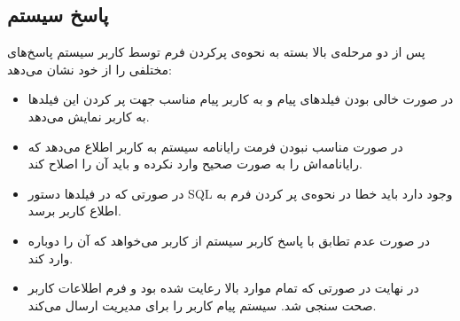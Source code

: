 \documentclass[a4paper]{article}
\begin{document}
\subsection{پاسخ سیستم}
پس از دو مرحله‌ی بالا بسته به نحوه‌ی پرکردن فرم توسط کاربر سیستم پاسخ‌های مختلفی را از خود نشان می‌دهد:
\begin{itemize}
\item
در صورت خالی بودن فیلدهای پیام و  به کاربر پیام مناسب جهت پر کردن این فیلدها به کاربر نمایش می‌دهد.
\item
در صورت مناسب نبودن فرمت رایانامه سیستم به کاربر اطلاع می‌دهد که رایانامه‌اش را به صورت صحیح وارد نکرده و باید آن را اصلاح کند.
\item
در صورتی که در فیلد‌ها دستور SQL وجود دارد باید خطا در نحوه‌ی پر کردن فرم به اطلاع کاربر برسد.
\item
در صورت عدم تطابق  با پاسخ کاربر سیستم از کاربر می‌خواهد که آن را دوباره وارد کند.
\item
در نهایت در صورتی که تمام موارد بالا رعایت شده بود و فرم اطلاعات کاربر صحت سنجی شد. سیستم پیام کاربر را برای مدیریت ارسال می‌کند.
\end{itemize}
\end{document}
